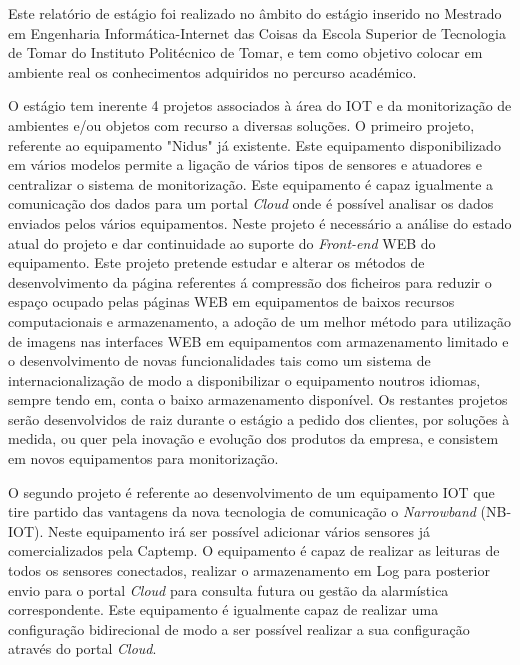 
\vspace{1cm}
\noindent
\par Este relatório de estágio foi realizado no âmbito do estágio inserido no Mestrado em Engenharia Informática-Internet das Coisas da Escola Superior de Tecnologia de Tomar do Instituto Politécnico de Tomar, e tem como objetivo colocar em ambiente real os conhecimentos adquiridos no percurso académico.

\par O estágio tem inerente 4 projetos associados à área do IOT e da monitorização de ambientes e/ou objetos com recurso a diversas soluções. O primeiro projeto, referente ao equipamento "Nidus" já existente. Este equipamento disponibilizado em vários modelos permite a ligação de vários tipos de sensores e atuadores  e centralizar o sistema de monitorização. Este equipamento é capaz igualmente a comunicação dos dados para um portal \textit{Cloud} onde é possível analisar os dados enviados pelos vários equipamentos. Neste projeto é necessário a análise do estado atual do projeto e dar continuidade ao suporte do \textit{Front-end} WEB do equipamento. Este projeto pretende estudar e alterar os métodos de desenvolvimento da página referentes á compressão dos ficheiros para reduzir o espaço ocupado pelas páginas WEB em equipamentos de baixos recursos computacionais e armazenamento, a adoção de um melhor método para utilização de imagens nas interfaces WEB em equipamentos com armazenamento limitado e o desenvolvimento de novas funcionalidades tais como um sistema de internacionalização de modo a disponibilizar o equipamento noutros idiomas, sempre tendo em, conta o baixo armazenamento disponível. Os restantes projetos serão desenvolvidos de raiz durante o estágio  a pedido dos clientes, por soluções à medida, ou quer pela inovação e evolução dos produtos da empresa, e consistem em novos equipamentos para monitorização.

\par O segundo projeto é referente ao desenvolvimento de um equipamento IOT que tire partido das vantagens da nova tecnologia de comunicação o \textit{Narrowband} (NB-IOT). Neste equipamento irá ser possível adicionar vários sensores já comercializados pela Captemp. O equipamento é capaz de realizar as leituras de todos os sensores conectados, realizar o armazenamento em Log para posterior envio para o portal \textit{Cloud} para consulta futura ou gestão da alarmística correspondente. Este equipamento é igualmente capaz de realizar uma configuração bidirecional de modo a ser possível realizar a sua configuração através do portal \textit{Cloud}.

